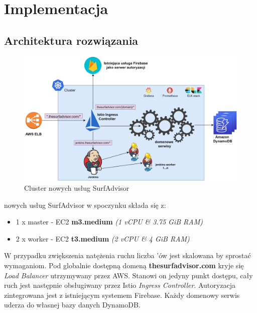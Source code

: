\chapter{Implementacja}
\label{cha:implementation}

\section{Architektura rozwiązania}

\begin{figure}[!ht]
	\begin{center}
		\includegraphics[width=1\textwidth]{img/surf-cluster}
	\end{center}
	\caption{Cluster nowych usług SurfAdvisor}
\end{figure}

 nowych usług SurfAdvisor w spoczynku składa się z: 

\begin{itemize}
    \item
    1 x master  - EC2 \textbf{m3.medium} \emph{(1 vCPU \& 3.75 GiB RAM)}

    \item
    2 x worker  - EC2 \textbf{t3.medium} \emph{(2 vCPU \& 4 GiB RAM)}
\end{itemize} 

W przypadku zwiększenia natężenia ruchu liczba 'ów jest skalowana by sprostać wymaganiom.
Pod globalnie dostępną domeną \textbf{thesurfadvisor.com} kryje się \emph{Load Balancer} utrzymywany przez AWS.
Stanowi on jedyny punkt dostępu, cały ruch jest następnie obsługiwany przez Istio \emph{Ingress Controller}.
Autoryzacja zintegrowana jest z istniejącym systemem Firebase. Każdy domenowy serwis uderza do własnej bazy danych DynamoDB.

